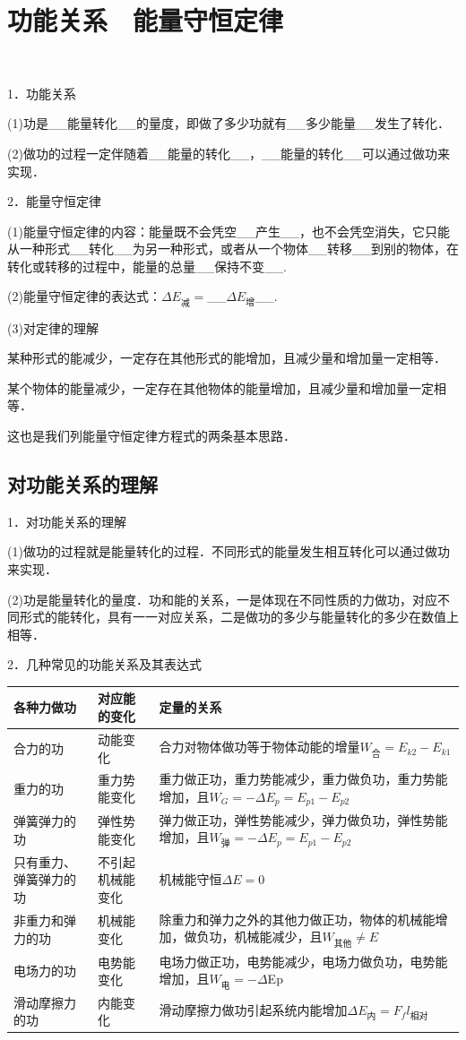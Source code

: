 \newpage
\section{功能关系　能量守恒定律}　


1．功能关系

(1)功是\_\_能量转化\_\_的量度，即做了多少功就有\_\_多少能量\_\_发生了转化．

(2)做功的过程一定伴随着\_\_能量的转化\_\_，\_\_能量的转化\_\_可以通过做功来实现．

2．能量守恒定律

(1)能量守恒定律的内容：能量既不会凭空\_\_产生\_\_，也不会凭空消失，它只能从一种形式\_\_转化\_\_为另一种形式，或者从一个物体\_\_转移\_\_到别的物体，在转化或转移的过程中，能量的总量\_\_保持不变\_\_.

(2)能量守恒定律的表达式：$\Delta E_{\text{减}}=$\_\_$\Delta E_{\text{增}}$\_\_.

(3)对定律的理解

某种形式的能减少，一定存在其他形式的能增加，且减少量和增加量一定相等．

某个物体的能量减少，一定存在其他物体的能量增加，且减少量和增加量一定相等．

这也是我们列能量守恒定律方程式的两条基本思路．

\newpage
\subsection{对功能关系的理解}

1．对功能关系的理解

(1)做功的过程就是能量转化的过程．不同形式的能量发生相互转化可以通过做功来实现．

(2)功是能量转化的量度．功和能的关系，一是体现在不同性质的力做功，对应不同形式的能转化，具有一一对应关系，二是做功的多少与能量转化的多少在数值上相等．

2．几种常见的功能关系及其表达式

\begin{longtable}[]{@{}m{2cm}m{1.5cm}m{10cm}@{}}
\toprule
各种力做功 & 对应能的变化 & 定量的关系\tabularnewline
\midrule
\endhead
合力的功 & 动能变化 &
合力对物体做功等于物体动能的增量$W_{\text{合}}=E_{k2}-E_{k1}$\tabularnewline
重力的功 & 重力势能变化 &
重力做正功，重力势能减少，重力做负功，重力势能增加，且$W_G=-\Delta E_p=E_{p1}-E_{p2}$\tabularnewline
弹簧弹力的功 & 弹性势能变化 &
弹力做正功，弹性势能减少，弹力做负功，弹性势能增加，且$W_{\text{弹}}=-\Delta E_p=E_{p1}-E_{p2}$\tabularnewline
只有重力、弹簧弹力的功 & 不引起机械能变化 &
机械能守恒$\Delta E=0$\tabularnewline
非重力和弹力的功 & 机械能变化 &
除重力和弹力之外的其他力做正功，物体的机械能增加，做负功，机械能减少，且$W_{\text{其他}}\neq E$\tabularnewline
电场力的功 & 电势能变化 &
电场力做正功，电势能减少，电场力做负功，电势能增加，且$W_{\text{电}}=-\Delta$Ep\tabularnewline
滑动摩擦力的功 & 内能变化 &
滑动摩擦力做功引起系统内能增加$\Delta E_{\text{内}}=F_fl_{\text{相对}}$\tabularnewline
\bottomrule
\end{longtable}

